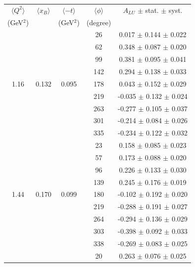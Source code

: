\documentclass{article}
\begin{document}
\begin{table}[!h]
   \begin{center}
      \begin{tabular}{|c|c|c|c|c|}
         \hline
 $\langle Q^{2} \rangle$ & $\langle x_{B} \rangle$ & $\langle -t \rangle$ & $\langle \phi \rangle$ & $A_{LU}$ $\pm$ stat. $\pm$ syst.\\
 (GeV$^{2}$) &           & (GeV$^{2}$) & (degree) &  \\
         \hline

        &       &       &  26   &  0.017  $\pm$ 0.144  $\pm$ 0.022  \\
        &       &       &  62   &  0.348  $\pm$ 0.087  $\pm$ 0.020  \\
        &       &       &  99   &  0.381  $\pm$ 0.095  $\pm$ 0.041  \\
        &       &       & 142   &  0.294  $\pm$ 0.138  $\pm$ 0.033  \\
  1.16  & 0.132 & 0.095 & 178   &  0.043  $\pm$ 0.152  $\pm$ 0.029  \\
        &       &       & 219   & -0.035  $\pm$ 0.132  $\pm$ 0.024  \\
        &       &       & 263   & -0.277  $\pm$ 0.105  $\pm$ 0.037  \\
        &       &       & 301   & -0.214  $\pm$ 0.084  $\pm$ 0.026  \\
        &       &       & 335   & -0.234  $\pm$ 0.122  $\pm$ 0.032  \\
   \hline 
        &       &       &   23  &  0.158  $\pm$ 0.085  $\pm$ 0.023  \\
        &       &       &   57  &  0.173  $\pm$ 0.088  $\pm$ 0.020  \\
        &       &       &   96  &  0.226  $\pm$ 0.133  $\pm$ 0.030  \\
        &       &       &  139  &  0.245  $\pm$ 0.176  $\pm$ 0.019  \\
  1.44  & 0.170 & 0.099 &  180  & -0.102  $\pm$ 0.192  $\pm$ 0.020  \\
        &       &       &  219  & -0.288  $\pm$ 0.191  $\pm$ 0.027  \\
        &       &       &  264  & -0.294  $\pm$ 0.136  $\pm$ 0.029  \\
        &       &       &  303  & -0.398  $\pm$ 0.092  $\pm$ 0.033  \\
        &       &       &  338  & -0.269  $\pm$ 0.083  $\pm$ 0.025  \\
   \hline 
        &       &       &  20   &  0.263  $\pm$ 0.076  $\pm$ 0.025  \\

\end{tabular}
\end{center}
\end{table}
\end{document}
